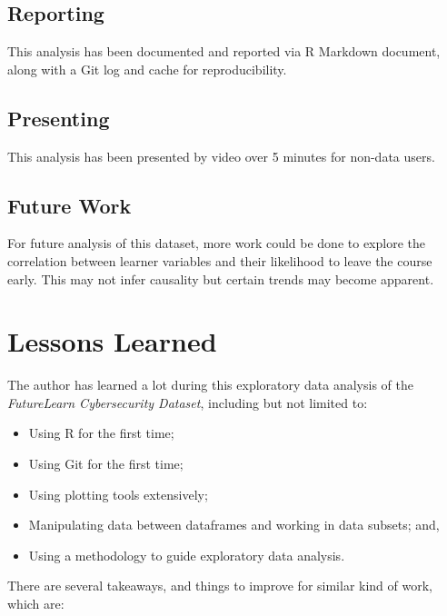 \documentclass[
]{article}
\begin{document}
\hypertarget{reporting}{%
\subsection{Reporting}\label{reporting}}

This analysis has been documented and reported via R Markdown document,
along with a Git log and cache for reproducibility.

\hypertarget{presenting}{%
\subsection{Presenting}\label{presenting}}

This analysis has been presented by video over 5 minutes for non-data
users.

\hypertarget{future-work}{%
\subsection{Future Work}\label{future-work}}

For future analysis of this dataset, more work could be done to explore
the correlation between learner variables and their likelihood to leave
the course early. This may not infer causality but certain trends may
become apparent.

\newpage

\hypertarget{lessons-learned}{%
\section{Lessons Learned}\label{lessons-learned}}

The author has learned a lot during this exploratory data analysis of
the \emph{FutureLearn Cybersecurity Dataset}, including but not limited
to:

\begin{itemize}
\item
  Using R for the first time;
\item
  Using Git for the first time;
\item
  Using plotting tools extensively;
\item
  Manipulating data between dataframes and working in data subsets; and,
\item
  Using a methodology to guide exploratory data analysis.
\end{itemize}

There are several takeaways, and things to improve for similar kind of
work, which are:
\end{document}

